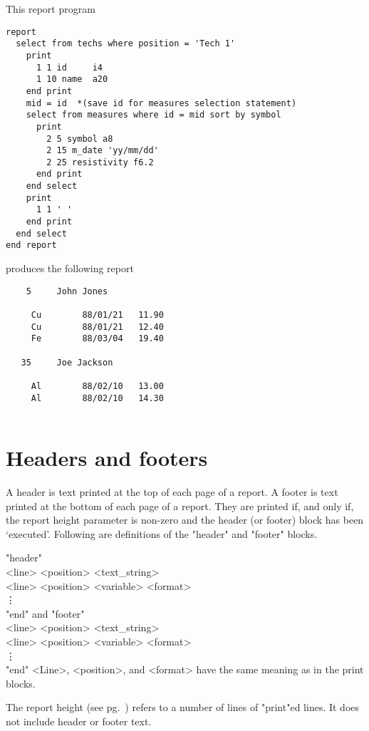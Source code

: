 \demobreak
This report program
\begin{verbatim}
report
  select from techs where position = 'Tech 1'
    print
      1 1 id     i4
      1 10 name  a20
    end print
    mid = id  *(save id for measures selection statement)
    select from measures where id = mid sort by symbol
      print
        2 5 symbol a8
        2 15 m_date 'yy/mm/dd'
        2 25 resistivity f6.2
      end print
    end select
    print
      1 1 ' '
    end print
  end select
end report
\end{verbatim}
\demobreak
produces the following report
 
\Rimdisp
\begin{verbatim}
    5     John Jones
 
     Cu        88/01/21   11.90
     Cu        88/01/21   12.40
     Fe        88/03/04   19.40
 
   35     Joe Jackson
 
     Al        88/02/10   13.00
     Al        88/02/10   14.30
 
\end{verbatim}
\enddisp
 
\section{Headers and footers}
%
A header is text printed at the top of each page of a report.
A footer is text printed at the bottom of each page of a report.
They are printed if, and only if,
the report height parameter is non-zero and
the header (or footer) block has been `executed'.
Following are definitions of the "header" and "footer" blocks.
 
\<"header"\\
  <line> <position> <text_string>\\
  <line> <position> <variable> <format>\\
  \qquad  \vdots\\
  "end" \>
and
\<"footer"\\
  <line> <position> <text_string>\\
  <line> <position> <variable> <format>\\
  \qquad  \vdots\\
  "end" \>
<Line>, <position>, and <format> have the same meaning
as in the print blocks.
 
The report height (see pg.~\pageref{set-height}) refers to
a number of lines of "print"ed lines.  It does not
include header or footer text.
 
